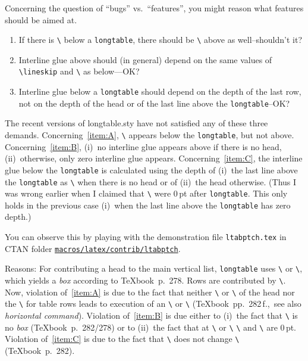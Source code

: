\documentclass[DIV=9, parskip=half, pagesize=auto]{scrartcl}
\makeatletter
\newcommand*{\pkg}[1]{\textsf{#1}}
\newcommand*{\cs}[1]{\texttt{\textbackslash#1}}
\newcommand*{\cmd}[1]{\cs{\expandafter\@gobble\string#1}}
\newcommand*{\env}[1]{\texttt{#1}}
\newcommand*{\meta}[1]{\textlangle\textsl{#1}\textrangle}
\makeatother
\begin{document}
Concerning the question of ``bugs'' vs.\ ``features'', you might 
reason what features should be aimed at. 
%
\begin{enumerate}
\item \label{item:A} If there is \cmd{\parskip} below a \env{longtable}, there should 
  be \cmd{\parskip} above as well--shouldn't it? 
\item \label{item:B} Interline glue above should (in general) depend on the 
  same values of \cmd{\base\-line\-skip} and \cmd{\lineskip} as below---OK? 
\item \label{item:C} Interline glue below a \env{longtable} should depend on the 
  depth of the last row, not on the depth of the head or of the 
  last line above the \env{longtable}--OK? 
\end{enumerate}
%
The recent versions of \pkg{longtable.sty} have not satisfied any 
of these three demands. 
Concerning~\ref{item:A}, \cmd{\parskip} appears below the \env{longtable}, but not 
above. 
Concerning~\ref{item:B}, (i)~no interline glue appears above if there 
is no head, (ii)~otherwise, only zero interline glue appears.
Concerning~\ref{item:C}, the interline glue below the \env{longtable} is 
calculated using the depth of (i)~the last line above the 
\env{longtable} as \cmd{\prevdepth} when there is no head or of (ii)~the 
head otherwise. (Thus I was wrong earlier when I claimed that 
\cmd{\prevdepth} were 0\,pt after \env{longtable}. This only holds in the 
previous case (i)~when the last line above the \env{longtable} has 
zero depth.)

You can observe this by playing with the demonstration file 
\texttt{ltabptch.tex} in CTAN folder \href{http://www.ctan.org/pub/tex-archive/macros/latex/contrib/ltabptch/}{\texttt{macros/latex/contrib/ltabptch}}.

Reasons: For contributing a head to the main vertical list, 
\env{longtable} uses \cmd{\copy} or \cmd{\box}, which yields a \meta{box} according 
to \TeX book~p.~278. Rows are contributed by \cmd{\unvbox}. Now, 
violation of~\ref{item:A} is due to the fact that neither \cmd{\copy} or 
\cmd{\box} of the head nor the \cmd{\unvbox} for table rows leads to 
execution of an \cmd{\indent} or \cmd{\noindent} (\TeX book~pp.~282\,f.,\ see 
also \meta{horizontal command}). 
Violation of~\ref{item:B} is due either to (i)~the fact that \cmd{\unvbox} 
is no \meta{box} (\TeX book~p.~282/278) or to (ii)~the fact that at 
\cmd{\copy} or \cmd{\box} \cmd{\baselineskip} and \cmd{\lineskip} are 0\,pt. 
Violation of~\ref{item:C} is due to the fact that \cmd{\unvbox} does not 
change \cmd{\prevdepth} (\TeX book~p.~282). 
\end{document}
